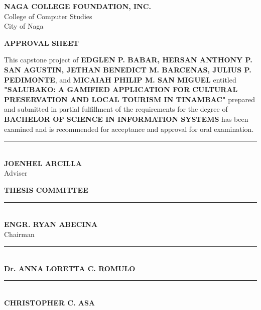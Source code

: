 \documentclass[11pt]{research}
\begin{document}
\begin{abstract}
The study concluded that integrating information systems with local culture through gamification is feasible for digital tourism promotion. The resulting application, "Salubako," helped in closing the gap in the digital documentation and promotion of provincial heritage, aligning with global goals for sustainable economic growth and cultural preservation.

\end{abstract}

\begin{center}
{\large \textbf{NAGA COLLEGE FOUNDATION, INC.}} \\[0.3em]
College of Computer Studies \\[0.2em]
City of Naga

\vspace{1.5cm}

{\large \textbf{APPROVAL SHEET}}
\end{center}

\vspace{1cm}

\hspace{0.5cm} This capstone project of \textbf{EDGLEN P. BABAR, HERSAN ANTHONY P. SAN AGUSTIN, JETHAN BENEDICT M. BARCENAS, JULIUS P. PEDIMONTE}, and \textbf{MICAIAH PHILIP M. SAN MIGUEL} entitled \textbf{"SALUBAKO: A GAMIFIED APPLICATION FOR CULTURAL PRESERVATION AND LOCAL TOURISM IN TINAMBAC"} prepared and submitted in partial fulfillment of the requirements for the degree of \textbf{BACHELOR OF SCIENCE IN INFORMATION SYSTEMS} has been examined and is recommended for acceptance and approval for oral examination.

\vspace{1.5cm}

\begin{center}
\rule{7cm}{0.4pt} \\
\textbf{JOENHEL ARCILLA} \\
Adviser

\vspace{1.5cm}

\textbf{THESIS COMMITTEE}

\vspace{1cm}

\rule{7cm}{0.4pt} \\
\textbf{ENGR. RYAN ABECINA} \\
Chairman

\vspace{1.5cm}

\begin{minipage}[t]{0.45\textwidth}
\centering
\rule{6cm}{0.4pt} \\
\textbf{Dr. ANNA LORETTA C. ROMULO}
\end{minipage}
\hfill
\begin{minipage}[t]{0.45\textwidth}
\centering
\rule{6cm}{0.4pt} \\
\textbf{CHRISTOPHER C. ASA}
\end{minipage}

\end{center}
\end{document}
